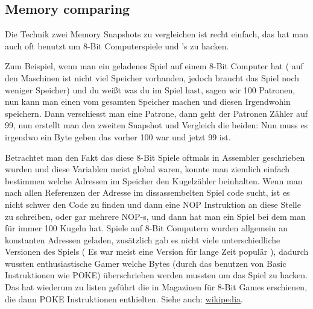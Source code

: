 \subsection{Memory  comparing}
\label{snapshots_comparing}

Die Technik zwei Memory Snapshots zu vergleichen ist recht einfach, das hat man auch oft benutzt um 8-Bit Computerspiele und
's  zu hacken.

Zum Beispiel, wenn man ein geladenes Spiel auf einem 8-Bit Computer hat ( auf den Maschinen ist nicht viel Speicher 
vorhanden, jedoch braucht das Spiel noch weniger Speicher) und du weißt was du im Spiel hast, sagen wir 100 Patronen, 
nun kann man einen  vom gesamten Speicher machen und diesen Irgendwohin speichern. Dann verschiesst man 
eine Patrone, dann geht der Patronen Zähler auf 99, nun erstellt man den zweiten Snapshot und Vergleich die beiden: 
Nun muss es irgendwo ein Byte geben das vorher 100 war und jetzt 99 ist. 


Betrachtet man den Fakt das diese 8-Bit Spiele oftmals in Assembler geschrieben wurden und diese Variablen meist global 
waren, konnte man ziemlich einfach bestimmen welche Adressen im Speicher den Kugelzähler beinhalten. Wenn man nach allen 
Referenzen der Adresse im dissassembelten Spiel code sucht, ist es nicht schwer den Code  
zu finden und dann eine \gls{NOP} Instruktion an diese Stelle zu schreiben, oder gar mehrere \gls{NOP}-s, und dann hat man 
ein Spiel bei dem man für immer 100 Kugeln hat. %
Spiele auf 8-Bit Computern wurden allgemein an konstanten Adressen geladen, zusätzlich gab es nicht viele unterschiedliche
Versionen des Spiels (  Es war meist eine Version für lange Zeit populär ), dadurch wussten enthusiastische Gamer welche
Bytes (durch das benutzen von Basic Instruktionen wie \gls{POKE}) überschrieben werden mussten um das Spiel zu hacken. 
Das hat wiederum zu  listen geführt die in Magazinen für 8-Bit Games erschienen, die dann \gls{POKE} Instruktionen enthielten.
Siehe auch: \href{http://go.yurichev.com/17114}{wikipedia}.



